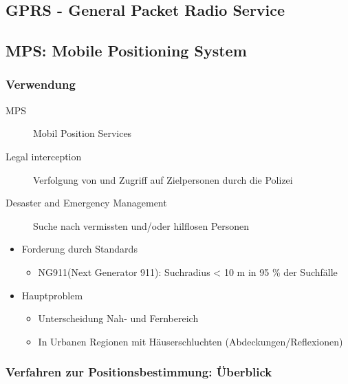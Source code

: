 \subsection{GPRS - General Packet Radio Service}



\subsection{MPS: Mobile Positioning System}

\subsubsection{Verwendung}
\begin{description}
\item [MPS] Mobil Position Services
\item [Legal interception] Verfolgung von und Zugriff auf Zielpersonen durch die Polizei
\item [Desaster and Emergency Management] Suche nach vermissten und/oder hilflosen Personen
\end{description}
\vspace{0.5cm}

\begin{itemize}
\item Forderung durch Standards
\begin{itemize}
\item NG911(Next Generator 911): Suchradius < 10 m in 95 \% der Suchfälle
\end{itemize}
\item Hauptproblem
\begin{itemize}
\item Unterscheidung Nah- und Fernbereich
\item In Urbanen Regionen mit Häuserschluchten (Abdeckungen/Reflexionen)
\end{itemize}
\end{itemize}

\subsubsection{Verfahren zur Positionsbestimmung: Überblick}


